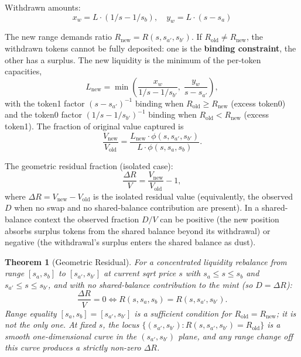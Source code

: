 \documentclass[11pt,a4paper]{article}
\newtheorem{theorem}{Theorem}
\begin{document}
Withdrawn amounts:
\begin{equation}\label{eq:withdrawn}
x_w = L \cdot (1/s - 1/s_b), \quad y_w = L \cdot (s - s_a)
\end{equation}

The new range demands ratio $R_{\text{new}} = R(s, s_{a'}, s_{b'})$. If $R_{\text{old}} \neq R_{\text{new}}$, the withdrawn tokens cannot be fully deposited: one is the \textbf{binding constraint}, the other has a surplus. The new liquidity is the minimum of the per-token capacities,
\begin{equation}\label{eq:cases}
L_{\text{new}} = \min\!\left(\frac{x_w}{1/s - 1/s_{b'}}, \; \frac{y_w}{s - s_{a'}}\right),
\end{equation}
with the token1 factor $(s - s_{a'})^{-1}$ binding when $R_{\text{old}} \geq R_{\text{new}}$ (excess token0) and the token0 factor $(1/s - 1/s_{b'})^{-1}$ binding when $R_{\text{old}} < R_{\text{new}}$ (excess token1). The fraction of original value captured is
\begin{equation}\label{eq:cases-value}
\frac{V_{\text{new}}}{V_{\text{old}}} = \frac{L_{\text{new}} \cdot \phi(s, s_{a'}, s_{b'})}{L \cdot \phi(s, s_a, s_b)}.
\end{equation}

The geometric residual fraction (isolated case):
\begin{equation}\label{eq:dv}
\frac{\Delta R}{V} = \frac{V_{\text{new}}}{V_{\text{old}}} - 1,
\end{equation}
where $\Delta R = V_{\text{new}} - V_{\text{old}}$ is the isolated residual value (equivalently, the observed $D$ when no swap and no shared-balance contribution are present). In a shared-balance context the observed fraction $D/V$ can be positive (the new position absorbs surplus tokens from the shared balance beyond its withdrawal) or negative (the withdrawal's surplus enters the shared balance as dust).

\begin{theorem}[Geometric Residual]\label{thm:residual}
For a concentrated liquidity rebalance from range $[s_a, s_b]$ to $[s_{a'}, s_{b'}]$ at current sqrt price $s$ with $s_a \leq s \leq s_b$ and $s_{a'} \leq s \leq s_{b'}$, and with no shared-balance contribution to the mint (so $D = \Delta R$):
\[
\frac{\Delta R}{V} = 0 \iff R(s, s_a, s_b) = R(s, s_{a'}, s_{b'}).
\]
Range equality $[s_a, s_b] = [s_{a'}, s_{b'}]$ is a sufficient condition for $R_{\text{old}} = R_{\text{new}}$; it is not the only one. At fixed $s$, the locus $\{(s_{a'}, s_{b'}) : R(s, s_{a'}, s_{b'}) = R_{\text{old}}\}$ is a smooth one-dimensional curve in the $(s_{a'}, s_{b'})$ plane, and any range change off this curve produces a strictly non-zero $\Delta R$.
\end{theorem}
\end{document}
